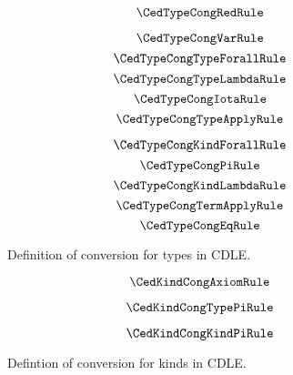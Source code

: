 \begin{figure}
    \centering
    $$\CedTypeCongRedRule$$
    \begin{minipage}{0.5\textwidth}
        $$\CedTypeCongVarRule$$
        $$\CedTypeCongTypeForallRule$$
        $$\CedTypeCongTypeLambdaRule$$
        $$\CedTypeCongIotaRule$$
        $$\CedTypeCongTypeApplyRule$$
    \end{minipage}%
    \begin{minipage}{0.5\textwidth}
        $$\CedTypeCongKindForallRule$$
        $$\CedTypeCongPiRule$$
        $$\CedTypeCongKindLambdaRule$$
        $$\CedTypeCongTermApplyRule$$
        $$\CedTypeCongEqRule$$
    \end{minipage}%
    \caption{
        Definition of conversion for types in CDLE.
    }
    \label{fig:4:type_cong}
\end{figure}

\begin{figure}
    \centering
    $$\CedKindCongAxiomRule$$
    \begin{minipage}{0.5\textwidth}
        $$\CedKindCongTypePiRule$$
    \end{minipage}%
    \begin{minipage}{0.5\textwidth}
        $$\CedKindCongKindPiRule$$
    \end{minipage}%
    \caption{
        Defintion of conversion for kinds in CDLE.
    }
    \label{fig:4:kind_cong}
\end{figure}
